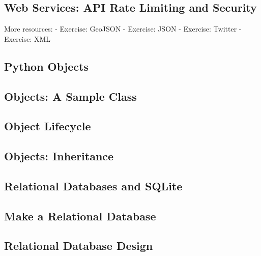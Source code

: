 \documentclass{article}%
\begin{document}
%
\subsection{Web Services: API Rate Limiting and Security}%
\label{subsec:WebServicesAPIRateLimitingandSecurity}%
More resources:\newline%
{-} Exercise: GeoJSON\newline%
{-} Exercise: JSON\newline%
{-} Exercise: Twitter\newline%
{-} Exercise: XML\newline%

%
\subsection{Python Objects}%
\label{subsec:PythonObjects}%

%
\subsection{Objects: A Sample Class}%
\label{subsec:ObjectsASampleClass}%

%
\subsection{Object Lifecycle}%
\label{subsec:ObjectLifecycle}%

%
\subsection{Objects: Inheritance}%
\label{subsec:ObjectsInheritance}%

%
\subsection{Relational Databases and SQLite}%
\label{subsec:RelationalDatabasesandSQLite}%

%
\subsection{Make a Relational Database}%
\label{subsec:MakeaRelationalDatabase}%

%
\subsection{Relational Database Design}%
\label{subsec:RelationalDatabaseDesign}%

%
\end{document}

